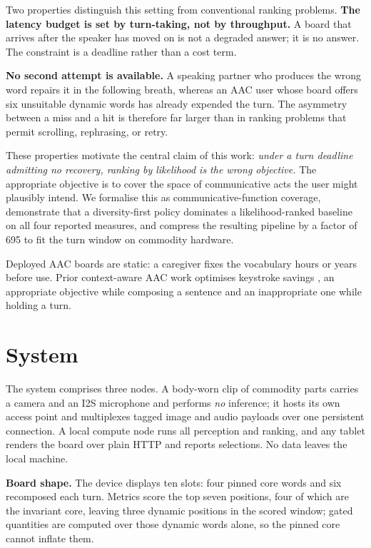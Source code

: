 Two properties distinguish this setting from conventional ranking problems.
\textbf{The latency budget is set by turn-taking, not by throughput.} A board
that arrives after the speaker has moved on is not a degraded answer; it is no
answer. The constraint is a deadline rather than a cost term.

\textbf{No second attempt is available.} A speaking partner who produces the
wrong word repairs it in the following breath, whereas an AAC user whose board
offers six unsuitable dynamic words has already expended the turn. The asymmetry
between a miss and a hit is therefore far larger than in ranking problems that
permit scrolling, rephrasing, or retry.

These properties motivate the central claim of this work: \emph{under a turn
deadline admitting no recovery, ranking by likelihood is the wrong objective.}
The appropriate objective is to cover the space of communicative acts the user
might plausibly intend. We formalise this as communicative-function coverage,
demonstrate that a diversity-first policy dominates a likelihood-ranked baseline
on all four reported measures, and compress the resulting pipeline by a factor of
695 to fit the turn window on commodity hardware.

Deployed AAC boards are static: a caregiver fixes the vocabulary hours or years
before use. Prior context-aware AAC work optimises keystroke savings
\citep{kwickchat2022,praact2024}, an appropriate objective while composing a
sentence and an inappropriate one while holding a turn.

\section{System}

The system comprises three nodes. A body-worn clip of commodity parts carries a
camera and an I2S microphone and performs \emph{no} inference; it hosts its own
access point and multiplexes tagged image and audio payloads over one persistent
connection. A local compute node runs all perception and ranking, and any tablet
renders the board over plain HTTP and reports selections. No data leaves the
local machine.

\textbf{Board shape.} The device displays ten slots: four pinned core words and
six recomposed each turn. Metrics score the top seven positions, four of which
are the invariant core, leaving three dynamic positions in the scored window;
gated quantities are computed over those dynamic words alone, so the pinned core
cannot inflate them.

